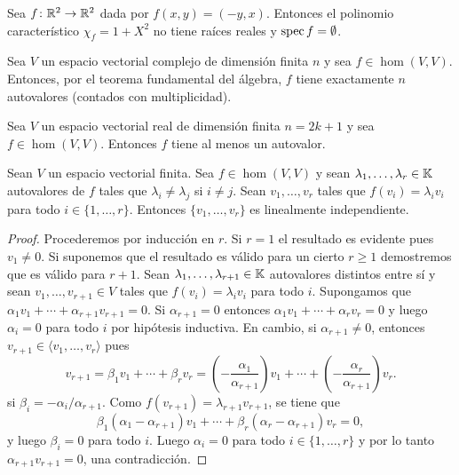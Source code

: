 \begin{example}
	Sea $f\colon\mathbb{R}^2\to\mathbb{R}^2$ dada por $f(x,y)=(-y,x)$. Entonces el polinomio
	característico $\chi_f=1+X^2$ no tiene raíces reales y $\operatorname{spec} f=\emptyset$. 
\end{example}

\begin{example}
	Sea $V$ un espacio vectorial complejo de dimensión finita $n$ y sea
	$f\in\hom(V,V)$.  Entonces, por el teorema fundamental del álgebra, $f$
	tiene exactamente $n$ autovalores (contados con multiplicidad).
\end{example}

\begin{example}
	Sea $V$ un espacio vectorial real de dimensión finita $n=2k+1$ y sea
	$f\in\hom(V,V)$.  Entonces $f$ tiene al menos un autovalor.
\end{example}

\begin{lem}
	Sean $V$ un espacio vectorial finita. Sea $f\in\hom(V,V)$ y sean
	$\lambda_1,\dots,\lambda_r\in\mathbb{K}$ autovalores de $f$ tales que
	$\lambda_i\ne\lambda_j$ si $i\ne j$. Sean $v_1,\dots,v_r$ tales que
	$f(v_i)=\lambda_i v_i$ para todo $i\in\{1,\dots,r\}$. Entonces
	$\{v_1,\dots,v_r\}$ es linealmente independiente.

	\begin{proof}
		Procederemos por inducción en $r$. Si $r=1$ el resultado es evidente
		pues $v_1\ne0$. Si suponemos que el resultado es válido para un cierto
		$r\geq1$ demostremos que es válido para $r+1$. Sean
		$\lambda_1,\dots,\lambda_{r+1}\in\mathbb{K}$ autovalores distintos entre sí y
		sean $v_1,\dots,v_{r+1}\in V$ tales que $f(v_i)=\lambda_i v_i$ para
		todo $i$. Supongamos que $\alpha_1v_1+\cdots+\alpha_{r+1}v_{r+1}=0$. Si
		$\alpha_{r+1}=0$ entonces $\alpha_1v_1+\cdots+\alpha_rv_r=0$ y luego
		$\alpha_i=0$ para todo $i$ por hipótesis inductiva. En cambio, si
		$\alpha_{r+1}\ne0$, entonces $v_{r+1}\in\langle v_1,\dots,v_r\rangle$
		pues 
		\[
		v_{r+1}=\beta_1v_1+\cdots+\beta_rv_r=\left(-\frac{\alpha_1}{\alpha_{r+1}}\right)v_1+\cdots+\left(-\frac{\alpha_r}{\alpha_{r+1}}\right)v_r.
		\]
		si $\beta_i=-\alpha_i/\alpha_{r+1}$.
		Como $f(v_{r+1})=\lambda_{r+1}v_{r+1}$, se tiene que 
		\[
		\beta_1(\alpha_1-\alpha_{r+1})v_1+\cdots+\beta_r(\alpha_r-\alpha_{r+1})v_r=0,
		\]
		y luego $\beta_i=0$ para todo $i$. Luego $\alpha_i=0$ para todo
		$i\in\{1,\dots,r\}$ y por lo tanto $\alpha_{r+1}v_{r+1}=0$, una
		contradicción.
	\end{proof}
\end{lem}

